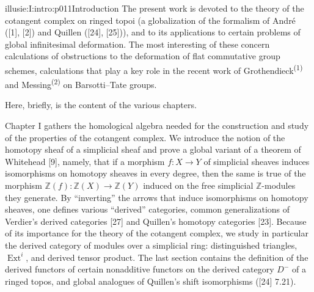 \IllusieSetPhysicalPageSize{450.6bp}{704bp}
\begin{illusiefrontpage}{illusie:I:intro:p011}{Introduction}
\hypertarget{illusie:I:intro}{}\hypertarget{illusie:I:intro:p011:p1}{}%
The present work is devoted to the theory of the cotangent complex on ringed topoi
(a globalization of the formalism of André ([1], [2]) and Quillen ([24], [25])),
and to its applications to certain problems of global infinitesimal deformation.
The most interesting of these concern calculations of obstructions to the deformation of
flat commutative group schemes, calculations that play a key role in the recent
work of Grothendieck\textsuperscript{(1)} and Messing\textsuperscript{(2)} on
Barsotti--Tate groups.

\vspace{4bp}
\hypertarget{illusie:I:intro:p011:p2}{}%
Here, briefly, is the content of the various chapters.

\vspace{4bp}
\hypertarget{illusie:I:intro:p011:p3}{}%
Chapter I gathers the homological algebra needed for the construction and study
of the properties of the cotangent complex. We introduce the notion of the
homotopy sheaf of a simplicial sheaf and prove a global variant of a theorem of
Whitehead [9], namely, that if a morphism $f:X\longrightarrow Y$ of simplicial
sheaves induces isomorphisms on homotopy sheaves in every degree, then the same is
true of the morphism
$\mathbb Z(f):\mathbb Z(X)\longrightarrow\mathbb Z(Y)$ induced on the free
simplicial $\mathbb Z$-modules they generate. By ``inverting'' the arrows that
induce isomorphisms on homotopy sheaves, one defines various ``derived''
categories, common generalizations of Verdier's derived categories [27] and
Quillen's homotopy categories [23]. Because of its importance for the theory of
the cotangent complex, we study in particular the derived category of modules
over a simplicial ring: distinguished triangles, $\operatorname{Ext}^{i}$, and
derived tensor product. The last section contains the definition of the derived
functors of certain nonadditive functors on the derived category $D^{-}$ of a
ringed topos, and global analogues of Quillen's shift isomorphisms ([24] 7.21).

\IllusieNoteRule
{}\hypertarget{illusie:I:intro:p011:n1}{}%
\hypertarget{illusie:I:intro:p011:n2}{}%
\end{illusiefrontpage}

